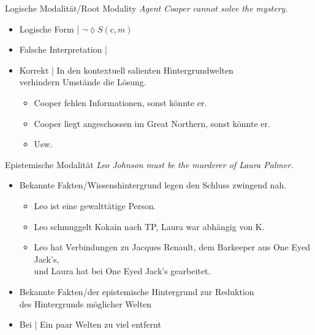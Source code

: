 \begin{frame}
  {Logische Modalität\slash Root Modality}
  \onslide<+->
  \onslide<+->
  \textit{Agent Cooper \alert{cannot} solve the mystery.}\\
  \Halbzeile
  \begin{itemize}[<+->]
    \item Logische Form | $\neg\lozenge S(c,m)$
      \Halbzeile
    \item Falsche Interpretation | 
    \item Korrekt | In den \alert{kontextuell salienten Hintergrundwelten}\\
      verhindern Umstände die Lösung.
      \Viertelzeile
      \begin{itemize}[<+->]
        \item Cooper fehlen Informationen, sonst könnte er.
        \item Cooper liegt angeschossen im Great Northern, sonst könnte er.
        \item Usw.
      \end{itemize}
  \end{itemize}
\end{frame}


\begin{frame}
  {Epistemische Modalität}
  \onslide<+->
  \onslide<+->
  \textit{Leo Johnson \alert{must} be the murderer of Laura Palmer.}\\
  \Halbzeile
  \begin{itemize}[<+->]
    \item \alert{Bekannte Fakten}\slash \alert{Wissenshintergrund} legen den Schluss zwingend nah.\\
      \begin{itemize}[<+->]
        \item Leo ist eine gewalttätige Person.
        \item Leo schmuggelt Kokain nach TP, Laura war abhängig von K.
        \item Leo hat Verbindungen zu Jacques Renault, dem Barkeeper aus One Eyed Jack's,\\
          und Laura hat bei One Eyed Jack's gearbeitet.
      \end{itemize}
      \Halbzeile
    \item Bekannte Fakten\slash der \alert{epistemische Hintergrund} zur \alert{Reduktion}\\
      \alert{des Hintergrunds möglicher Welten}
    \item Bei  | Ein paar Welten zu viel entfernt
  \end{itemize}
\end{frame}



